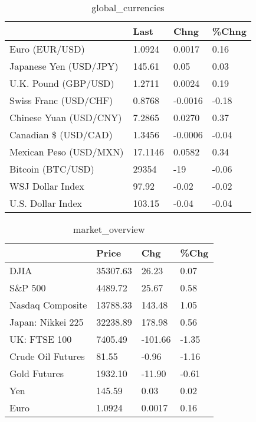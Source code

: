 \documentclass{article}%
\begin{document}
%


\begin{table}[htbp]%
\caption{global\_currencies}%
\centering%
\begin{adjustbox}{width=1\textwidth}%
\begin{tabular}{llll}
\toprule
                       &    Last &    Chng & \%Chng \\
\midrule
        Euro (EUR/USD) &  1.0924 &  0.0017 &  0.16 \\
Japanese Yen (USD/JPY) &  145.61 &    0.05 &  0.03 \\
  U.K. Pound (GBP/USD) &  1.2711 &  0.0024 &  0.19 \\
 Swiss Franc (USD/CHF) &  0.8768 & -0.0016 & -0.18 \\
Chinese Yuan (USD/CNY) &  7.2865 &  0.0270 &  0.37 \\
  Canadian \$ (USD/CAD) &  1.3456 & -0.0006 & -0.04 \\
Mexican Peso (USD/MXN) & 17.1146 &  0.0582 &  0.34 \\
     Bitcoin (BTC/USD) &   29354 &     -19 & -0.06 \\
      WSJ Dollar Index &   97.92 &   -0.02 & -0.02 \\
     U.S. Dollar Index &  103.15 &   -0.04 & -0.04 \\
\bottomrule
\end{tabular}
%
\end{adjustbox}%
\end{table}

%


\begin{table}[htbp]%
\caption{market\_overview}%
\centering%
\begin{adjustbox}{width=1\textwidth}%
\begin{tabular}{llll}
\toprule
                  &    Price &     Chg &  \%Chg \\
\midrule
             DJIA & 35307.63 &   26.23 &  0.07 \\
          S\&P 500 &  4489.72 &   25.67 &  0.58 \\
 Nasdaq Composite & 13788.33 &  143.48 &  1.05 \\
Japan: Nikkei 225 & 32238.89 &  178.98 &  0.56 \\
     UK: FTSE 100 &  7405.49 & -101.66 & -1.35 \\
Crude Oil Futures &    81.55 &   -0.96 & -1.16 \\
     Gold Futures &  1932.10 &  -11.90 & -0.61 \\
              Yen &   145.59 &    0.03 &  0.02 \\
             Euro &   1.0924 &  0.0017 &  0.16 \\
\bottomrule
\end{tabular}
%
\end{adjustbox}%
\end{table}

%
\end{document}
